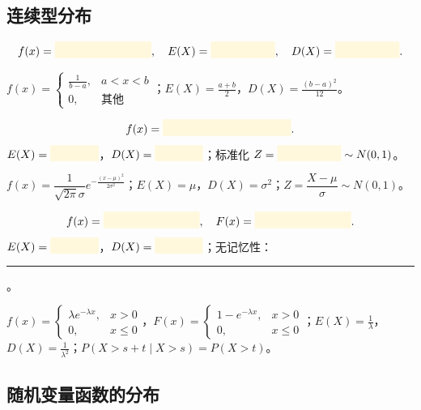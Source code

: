 \documentclass[11pt,a4paper]{article}
\newcommand{\blankbox}[1]{%
  \textcolor{blankyellow}{\rule[-0.1cm]{#1}{0.5cm}}%
}
\begin{document}
\subsection{连续型分布}

\begin{formulabox}[均匀分布 $U(a,b)$]
\[f(x) = \blankbox{3cm}, \quad E(X)=\blankbox{2cm}, \quad D(X)=\blankbox{2cm}.\]
\end{formulabox}

\begin{answerbox}
$f(x)=\begin{cases}\frac{1}{b-a},&a<x<b\\0,&\text{其他}\end{cases}$；$E(X)=\frac{a+b}{2}$，$D(X)=\frac{(b-a)^2}{12}$。
\end{answerbox}

\begin{formulabox}
\[f(x) = \blankbox{4cm}.\]
$E(X)=\blankbox{1.5cm}$，$D(X)=\blankbox{1.5cm}$；标准化 $Z=\blankbox{2cm}\sim N(0,1)$。
\end{formulabox}

\begin{answerbox}
$f(x)=\dfrac{1}{\sqrt{2\pi}\sigma}e^{-\frac{(x-\mu)^2}{2\sigma^2}}$；$E(X)=\mu$，$D(X)=\sigma^2$；$Z=\dfrac{X-\mu}{\sigma}\sim N(0,1)$。
\end{answerbox}

\begin{formulabox}
\[f(x) = \blankbox{3cm}, \quad F(x) = \blankbox{3cm}.\]
$E(X)=\blankbox{1.5cm}$，$D(X)=\blankbox{1.5cm}$；无记忆性：\blankbox{4cm}。
\end{formulabox}

\begin{answerbox}
$f(x)=\begin{cases}\lambda e^{-\lambda x},&x>0\\0,&x\leq 0\end{cases}$，$F(x)=\begin{cases}1-e^{-\lambda x},&x>0\\0,&x\leq 0\end{cases}$；$E(X)=\frac{1}{\lambda}$，$D(X)=\frac{1}{\lambda^2}$；$P(X>s+t\mid X>s)=P(X>t)$。
\end{answerbox}

\subsection{随机变量函数的分布}
\end{document}
